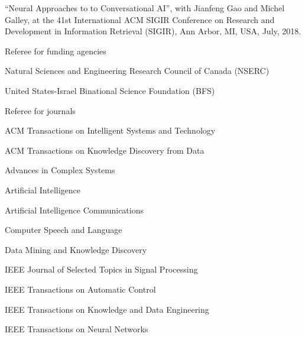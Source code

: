 \documentclass[10pt,twoside,letterpaper]{article}
\newcommand{\negitemspace}{\vspace{1mm}}
\begin{document}
\begin{compactitem}
\begin{compactitem}
\item{``Neural Approaches to to Conversational AI'', with Jianfeng Gao and Michel Galley, at the 41st
International ACM SIGIR Conference on Research and Development in Information Retrieval (SIGIR), Ann Arbor, MI, USA, July, 2018.}

\end{compactitem} \negitemspace

\item{Referee for funding agencies} \negitemspace

\begin{compactitem}

\item{Natural Sciences and Engineering Research Council of Canada (NSERC)}

\item{United States-Israel Binational Science Foundation (BFS)}

\end{compactitem}

\item{Referee for journals} \negitemspace

\begin{compactitem}

\item{ACM Transactions on Intelligent Systems and Technology}

\item{ACM Transactions on Knowledge Discovery from Data}

\item{Advances in Complex Systems}

\item{Artificial Intelligence}

\item{Artificial Intelligence Communications}

\item{Computer Speech and Language}

\item{Data Mining and Knowledge Discovery}

\item{IEEE Journal of Selected Topics in Signal Processing}

\item{IEEE Transactions on Automatic Control}

\item{IEEE Transactions on Knowledge and Data Engineering}

\item{IEEE Transactions on Neural Networks}


\end{compactitem}
\end{compactitem}
\end{document}
